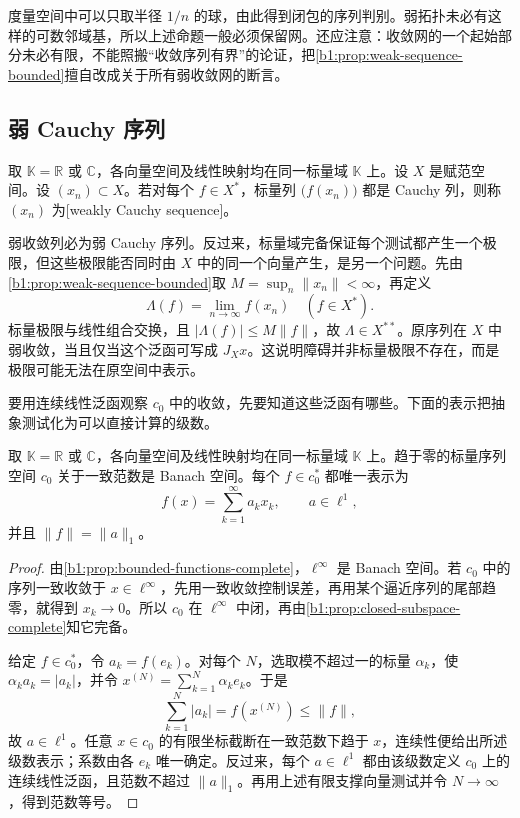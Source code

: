 度量空间中可以只取半径 \(1/n\) 的球，由此得到闭包的序列判别。弱拓扑未必有这样的可数邻域基，所以上述命题一般必须保留网。还应注意：收敛网的一个起始部分未必有限，不能照搬“收敛序列有界”的论证，把\cref{b1:prop:weak-sequence-bounded}擅自改成关于所有弱收敛网的断言。

\subsection{弱 Cauchy 序列}
\label{b1:subsec:090103}

\begin{definition}\label{b1:def:weak-cauchy}
取 \(\mathbb K=\mathbb R\) 或 \(\mathbb C\)，各向量空间及线性映射均在同一标量域 \(\mathbb K\) 上。设 \(X\) 是赋范空间。设 \((x_n)\subset X\)。若对每个 \(f\in X^*\)，标量列 \(\bigl(f(x_n)\bigr)\) 都是 Cauchy 列，则称 \((x_n)\) 为[weakly Cauchy sequence]。
\end{definition}

弱收敛列必为弱 Cauchy 序列。反过来，标量域完备保证每个测试都产生一个极限，但这些极限能否同时由 \(X\) 中的同一个向量产生，是另一个问题。先由\cref{b1:prop:weak-sequence-bounded}取 \(M=\sup_n\|x_n\|<\infty\)，再定义
\[
 \Lambda(f)=\lim_{n\to\infty}f(x_n)\quad(f\in X^*).
\]
标量极限与线性组合交换，且 \(|\Lambda(f)|\leq M\|f\|\)，故 \(\Lambda\in X^{**}\)。原序列在 \(X\) 中弱收敛，当且仅当这个泛函可写成 \(J_Xx\)。这说明障碍并非标量极限不存在，而是极限可能无法在原空间中表示。

\ProseParagraphBreak

要用连续线性泛函观察 \(c_0\) 中的收敛，先要知道这些泛函有哪些。下面的表示把抽象测试化为可以直接计算的级数。

\begin{proposition}[\(c_0\) 的连续对偶]\label{b1:prop:c0-dual}
取 \(\mathbb K=\mathbb R\) 或 \(\mathbb C\)，各向量空间及线性映射均在同一标量域 \(\mathbb K\) 上。趋于零的标量序列空间 \(c_0\) 关于一致范数是 Banach 空间。每个 \(f\in c_0^*\) 都唯一表示为
\[
 f(x)=\sum_{k=1}^{\infty}a_kx_k,
 \qquad a\in\ell^1,
\]
并且 \(\|f\|=\|a\|_1\)。
\end{proposition}
\begin{proof}
由\cref{b1:prop:bounded-functions-complete}，\(\ell^\infty\) 是 Banach 空间。若 \(c_0\) 中的序列一致收敛于 \(x\in\ell^\infty\)，先用一致收敛控制误差，再用某个逼近序列的尾部趋零，就得到 \(x_k\to0\)。所以 \(c_0\) 在 \(\ell^\infty\) 中闭，再由\cref{b1:prop:closed-subspace-complete}知它完备。

给定 \(f\in c_0^*\)，令 \(a_k=f(e_k)\)。对每个 \(N\)，选取模不超过一的标量 \(\alpha_k\)，使 \(\alpha_ka_k=|a_k|\)，并令 \(x^{(N)}=\sum_{k=1}^N\alpha_ke_k\)。于是
\[
 \sum_{k=1}^N|a_k|=f(x^{(N)})\leq\|f\|,
\]
故 \(a\in\ell^1\)。任意 \(x\in c_0\) 的有限坐标截断在一致范数下趋于 \(x\)，连续性便给出所述级数表示；系数由各 \(e_k\) 唯一确定。反过来，每个 \(a\in\ell^1\) 都由该级数定义 \(c_0\) 上的连续线性泛函，且范数不超过 \(\|a\|_1\)。再用上述有限支撑向量测试并令 \(N\to\infty\)，得到范数等号。
\end{proof}

